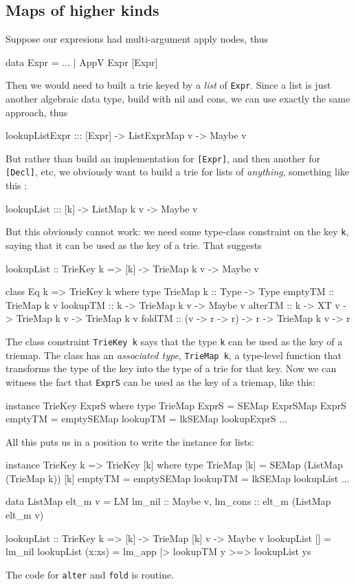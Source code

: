 \documentclass[acmsmall]{acmart}
\theoremstyle{theorem}
\theoremstyle{definition}
\theoremstyle{remark}
\begin{document}
\subsection{Maps of higher kinds}

Suppose our expresions had multi-argument apply nodes, thus
\begin{code}
data Expr = ...
          | AppV Expr [Expr]
\end{code}
Then we would need to built a trie keyed by a \emph{list} of \lstinline{Expr}.
Since a list is just another algebraic data type, build with nil and cons,
we can use exactly the same approach, thus
\begin{code}
lookupListExpr ::: [Expr] -> ListExprMap v -> Maybe v
\end{code}
But rather than build an implementation
for \lstinline{[Expr]}, and then another for \lstinline{[Decl]}, etc, we obviously
want to build a trie for lists of \emph{anything}, something like this \cite{hinze}:
\begin{code}
lookupList ::: [k] -> ListMap k v -> Maybe v
\end{code}
But this obviously cannot work: we need some type-class constraint on the key \lstinline{k},
saying that it can be used as the key of a trie.   That suggests
\begin{code}
lookupList :: TrieKey k => [k] -> TrieMap k v -> Maybe v

class Eq k => TrieKey k where
  type TrieMap k :: Type -> Type
  emptyTM  :: TrieMap k v
  lookupTM :: k -> TrieMap k v -> Maybe v
  alterTM  :: k -> XT v -> TrieMap k v -> TrieMap k v
  foldTM   :: (v -> r -> r) -> r -> TrieMap k v -> r
\end{code}
The class constraint \lstinline{TrieKey k} says that the type \lstinline{k}
can be used as the key of a triemap.
The class has an \emph{associated type}, \lstinline{TrieMap k},
a type-level function that transforms the type of the key into
the type of a trie for that key.  Now we can witness the fact that \lstinline{ExprS} can be
used as the key of a triemap, like this:
\begin{code}
instance TrieKey ExprS where
  type TrieMap ExprS = SEMap ExprSMap ExprS
  emptyTM  = emptySEMap
  lookupTM = lkSEMap lookupExprS
  ...
\end{code}
All this puts us in a position to write the instance for lists:
\begin{code}
instance TrieKey k => TrieKey [k] where
  type TrieMap [k] = SEMap (ListMap (TrieMap k)) [k]
  emptyTM  = emptySEMap
  lookupTM = lkSEMap lookupList
  ...

data ListMap elt_m v = LM { lm_nil  :: Maybe v, lm_cons :: elt_m (ListMap elt_m  v) }

lookupList :: TrieKey k => [k] -> TrieMap [k] v -> Maybe v
lookupList []     = lm_nil
lookupList (x:xs) = lm_app |> lookupTM y >=> lookupList ys
\end{code}
The code for \lstinline{alter} and \lstinline{fold} is routine.
\end{document}
